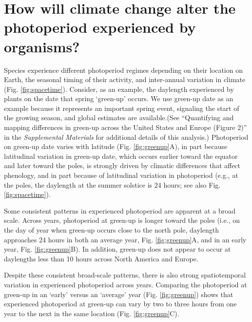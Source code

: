 \documentclass{article}
\begin{document}
\section*{How will climate change alter the photoperiod experienced by organisms?}
\par Species experience different photoperiod regimes depending on their location on Earth, the seasonal timing of their activity, and inter-annual variation in climate (Fig. \ref{fig:spacetime}). Consider, as an example, the daylength experienced by plants on the date that spring `green-up' occurs. We use green-up date as an example because it represents an important spring event, signaling the start of the growing season, and global estimates are available.(See ``Quantifying and mapping differences in green-up across the United States and Europe (Figure 2)'' in the \emph{Supplemental Materials} for additional details of this analysis.) Photoperiod on green-up date varies with latitude (Fig. \ref{fig:greenup}A), in part because latitudinal variation in green-up date, which occurs earlier toward the equator and later toward the poles, is strongly driven by climatic differences that affect phenology, and in part because of latitudinal variation in photoperiod (e.g., at the poles, the daylength at the summer solstice is 24 hours; see also Fig. \ref{fig:spacetime}). 
\par Some consistent patterns in experienced photoperiod are apparent at a broad scale. Across years, photoperiod at green-up is longer toward the poles (i.e., on the day of year when green-up occurs close to the north pole, daylength approaches 24 hours in both an average year, Fig. \ref{fig:greenup}A, and in an early year, Fig. \ref{fig:greenup}B). In addition, green-up does not appear to occur at daylengths less than 10 hours across North America and Europe. 
\par Despite these consistent broad-scale patterns, there is also strong spatiotemporal variation in experienced photoperiod across years. Comparing the photoperiod at green-up in an `early' versus an `average' year (Fig. \ref{fig:greenup}) shows that experienced photoperiod at green-up can vary by two to three hours from one year to the next in the same location (Fig. \ref{fig:greenup}C).%
\end{document}
